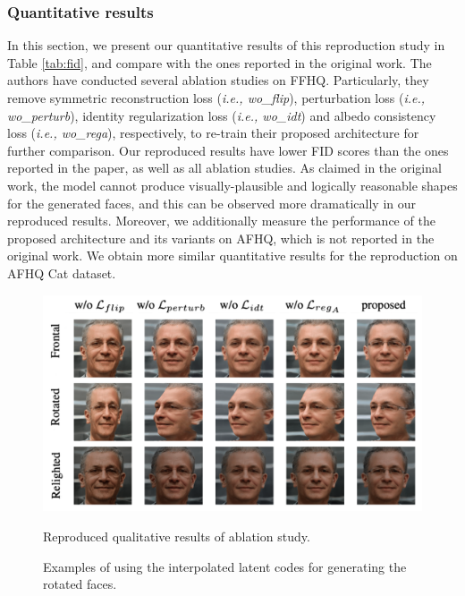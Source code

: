 \subsubsection{Quantitative results}

In this section, we present our quantitative results of this reproduction study in Table \ref{tab:fid}, and compare with the ones reported in the original work. The authors have conducted several ablation studies on FFHQ. Particularly, they remove symmetric reconstruction loss (\textit{i.e., wo\_flip}), perturbation loss (\textit{i.e., wo\_perturb}), identity regularization loss (\textit{i.e., wo\_idt}) and albedo consistency loss (\textit{i.e., wo\_rega}), respectively, to re-train their proposed architecture for further comparison. Our reproduced results have lower FID scores than the ones reported in the paper, as well as all ablation studies. As claimed in the original work, the model cannot produce visually-plausible and logically reasonable shapes for the generated faces, and this can be observed more dramatically in our reproduced results. Moreover, we additionally measure the performance of the proposed architecture and its variants on AFHQ, which is not reported in the original work. We obtain more similar quantitative results for the reproduction on AFHQ Cat dataset.

\begin{figure}[t!]%
    \centering
    {\includegraphics[width=0.5\linewidth]{../openreview/images/ablation_qialitative.png} }%
    \caption{Reproduced qualitative results of ablation study.}%
    \label{fig:ablation_qual}%
\end{figure}

\begin{figure}[t!]%
    \centering
    \qquad
    \caption{Examples of using the interpolated latent codes for generating the rotated faces.}%
    \label{fig:interpolation}%
\end{figure}

